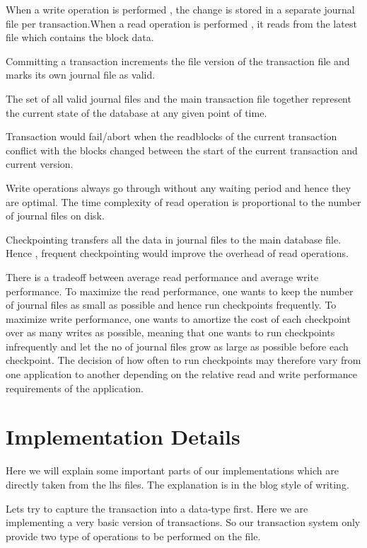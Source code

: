 \documentclass[11pt,a4paper]{article}
\begin{document}
When a write operation is performed , the change is stored in a separate journal file per transaction.When a read operation is performed , it reads from the latest file which contains the block data.

Committing a transaction increments the file version of the transaction file and marks its own journal file as valid.

The set of all valid journal files and the main transaction file together represent the current state of the database at any given point of time.

Transaction would fail/abort when the readblocks of the current transaction conflict with the blocks changed between the start of the current transaction and current version.

Write operations always go through without any waiting period and hence they are optimal.
The time complexity of read operation is proportional to the number of journal files on disk.

Checkpointing transfers all the data in journal files to the main database file. Hence , frequent checkpointing would improve the overhead of read operations.

There is a tradeoff between average read performance and average write performance. To maximize the read performance, one wants to keep the number of journal files as small as possible and hence run checkpoints frequently. To maximize write performance, one wants to amortize the cost of each checkpoint over as many writes as possible, meaning that one wants to run checkpoints infrequently and let the no of journal files grow as large as possible before each checkpoint. The decision of how often to run checkpoints may therefore vary from one application to another depending on the relative read and write performance requirements of the application.



\pagebreak
\section{Implementation Details}

Here we will explain some important parts of our implementations which are directly taken from the lhs files. The explanation is in the blog style of writing.

Lets try to capture the transaction into a data-type first. Here
we are implementing a very basic version of transactions. So our
transaction system only provide two type of operations to be performed
on the file.
\end{document}
